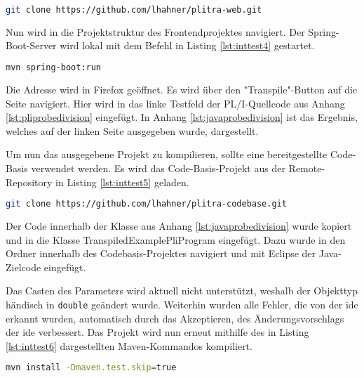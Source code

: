 \begin{lstlisting}[language=Bash, caption=Laden des Frontend-Projekts, label={lst:inttest3}]
git clone https://github.com/lhahner/plitra-web.git
\end{lstlisting}

Nun wird in die Projektstruktur des Frontendprojektes navigiert. Der Spring-Boot-Server wird lokal mit dem Befehl in Listing \ref{lst:inttest4} gestartet.

\begin{lstlisting}[language=Bash, caption=Starten des Spring-Boot-Servers, label={lst:inttest4}]
mvn spring-boot:run
\end{lstlisting}

Die Adresse  wird in Firefox geöffnet. Es wird über den "Transpile"-Button auf die Seite  navigiert. Hier wird in das linke Testfeld der PL/I-Quellcode aus Anhang \ref{lst:pliprobedivision} eingefügt. In Anhang \ref{lst:javaprobedivision} ist das Ergebnis, welches auf der linken Seite ausgegeben wurde, dargestellt.

Um nun das ausgegebene Projekt zu kompilieren, sollte eine bereitgestellte Code-Basis verwendet werden. Es wird das Code-Basis-Projekt aus der Remote-Repository in Listing \ref{lst:inttest5} geladen.

\begin{lstlisting}[language=Bash, caption=Laden der Code-Basis, label={lst:inttest5}]
git clone https://github.com/lhahner/plitra-codebase.git
\end{lstlisting}

Der Code innerhalb der Klasse aus Anhang \ref{lst:javaprobedivision} wurde kopiert und in die Klasse TranspiledExamplePliProgram eingefügt. Dazu wurde in den Ordner  innerhalb des Codebasis-Projektes navigiert und mit Eclipse der Java-Zielcode eingefügt.

Das Casten des Parameters wird aktuell nicht unterstützt, weshalb der Objekttyp händisch
in \verb+double+ geändert wurde. Weiterhin wurden alle Fehler, die von der \ac{ide} erkannt wurden, automatisch durch das Akzeptieren, des Änderungsvorschlags der  \ac{ide}  verbessert.
Das Projekt wird nun erneut mithilfe des in Listing \ref{lst:inttest6} dargestellten Maven-Kommandos kompiliert.

\begin{lstlisting}[language=Bash, caption=Kompilieren des Projekts, label={lst:inttest6}]
mvn install -Dmaven.test.skip=true
\end{lstlisting}

